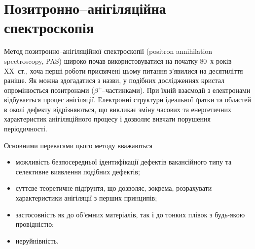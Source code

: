 \chapter{Позитронно--анігіляційна спектроскопія}\label{chapPAS}

Метод позитронно--анігіляційної спектроскопії
(positron annihilation spectroscopy, PAS)
широко почав використовуватися на початку 80--х років XX~ст.,
хоча перші роботи присвячені цьому питання з'явилися на десятиліття раніше.
Як можна здогадатися з назви, у подібних дослідженнях кристал опромінюється позитронами ($\beta^+$--частинками).
При їхній взаємодії з електронами відбувається процес анігіляції.
Електронні структури ідеальної ґратки та областей в околі дефекту
відрізняються, що викликає зміну часових та енергетичних характеристик
анігіляційного процесу і дозволяє вивчати порушення періодичності.


Основними перевагами цього методу вважаються
\begin{itemize}[leftmargin=0em,itemindent=1.5em]
\item можливість безпосередньої ідентифікації дефектів вакансійного типу та
селективне виявлення подібних дефектів;
\item суттєве теоретичне підґрунтя, що дозволяє, зокрема, розрахувати характеристики анігіляції з перших принципів;
\item застосовність як до об'ємних матеріалів, так і до тонких плівок з будь-якою провідністю;
\item неруйнівність.
\end{itemize}


